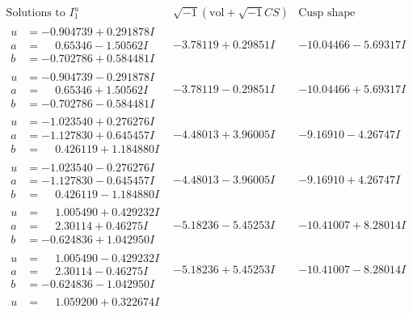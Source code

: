 \documentclass[1p]{elsarticle_modified}
\theoremstyle{definition}
\newcommand{\I}{\sqrt{-1}}
\begin{document}
$$\begin{array}{c|c|c}  
\text{Solutions to }I^u_{1}& \I (\text{vol} + \sqrt{-1}CS) & \text{Cusp shape}\\
 \hline 
\begin{aligned}
u &= -0.904739 + 0.291878 I \\
a &= \phantom{-}0.65346 - 1.50562 I \\
b &= -0.702786 + 0.584481 I\end{aligned}
 & -3.78119 + 0.29851 I & -10.04466 - 5.69317 I \\ \hline\begin{aligned}
u &= -0.904739 - 0.291878 I \\
a &= \phantom{-}0.65346 + 1.50562 I \\
b &= -0.702786 - 0.584481 I\end{aligned}
 & -3.78119 - 0.29851 I & -10.04466 + 5.69317 I \\ \hline\begin{aligned}
u &= -1.023540 + 0.276276 I \\
a &= -1.127830 + 0.645457 I \\
b &= \phantom{-}0.426119 + 1.184880 I\end{aligned}
 & -4.48013 + 3.96005 I & -9.16910 - 4.26747 I \\ \hline\begin{aligned}
u &= -1.023540 - 0.276276 I \\
a &= -1.127830 - 0.645457 I \\
b &= \phantom{-}0.426119 - 1.184880 I\end{aligned}
 & -4.48013 - 3.96005 I & -9.16910 + 4.26747 I \\ \hline\begin{aligned}
u &= \phantom{-}1.005490 + 0.429232 I \\
a &= \phantom{-}2.30114 + 0.46275 I \\
b &= -0.624836 + 1.042950 I\end{aligned}
 & -5.18236 - 5.45253 I & -10.41007 + 8.28014 I \\ \hline\begin{aligned}
u &= \phantom{-}1.005490 - 0.429232 I \\
a &= \phantom{-}2.30114 - 0.46275 I \\
b &= -0.624836 - 1.042950 I\end{aligned}
 & -5.18236 + 5.45253 I & -10.41007 - 8.28014 I \\ \hline\begin{aligned}
u &= \phantom{-}1.059200 + 0.322674 I \\

\end{aligned}
\end{array}$$
\end{document}
